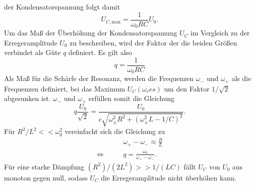 der Kondensatorspannung folgt damit
\begin{equation*}
    U_{C, \text{max}} = \frac{1}{\omega_0 RC} U_0  .
\end{equation*}
Um das Maß der Überhöhung der Kondensatorspannung $U_C$ im Vergleich zu der Erregeramplitude $U_0$ zu beschreiben, wird der Faktor der die beiden
Größen verbindet als Güte $q$ definiert. Es gilt also
\begin{equation}
    q=\frac{1}{\omega_0RC}
    \label{eqn:gute}
\end{equation}
Als Maß für die Schärfe der Resonanz, werden die Frequenzen $\omega_-$ und $\omega_+$ als die Frequenzen definiert, bei das Maximum $U_C(\omega_res)$
um den Faktor $1/\sqrt{2}$ abgesunken ist. $\omega_-$ und $\omega_+$ erfüllen somit die Gleichung
\begin{equation*}
    q\frac{U_0}{\sqrt{2}}=\frac{U_0}{c\sqrt{\omega_{\pm}^2R^2+(\omega_{\pm}^2L-1/C)^2}} .
\end{equation*}
Für $R^2/L^2<<\omega_0^2$ vereinfacht sich die Gleichung zu
\begin{align*}
                    &\omega_+-\omega_-\approx \frac{R}{L} \\
    \Leftrightarrow \qquad &q=\frac{\omega_0}{\omega_+-\omega_-}    .
\end{align*}
Für eine starke Dämpfung $(R^2)/(2L^2)>>1/(LC)$ fällt $U_C$ von $U_0$ aus monoton gegen null, sodass $U_C$ die Erregeramplitude nicht überhöhen kann. 